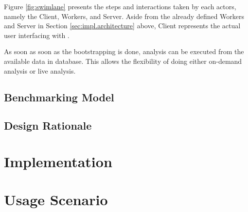 Figure \ref{fig:swimlane} presents the steps and interactions taken by each actors, namely the Client, Workers, and Server.
Aside from the already defined Workers and Server in Section \ref{sec:impl.architecture} above, Client represents the actual user interfacing with \OurBenchmarkingTool.


As soon as soon as the bootstrapping is done, analysis can be executed from the available data in database.
This allows the flexibility of doing either on-demand analysis or live analysis.


\subsection{Benchmarking Model}



\subsection{Design Rationale}


\section{Implementation}
\section{Usage Scenario}
